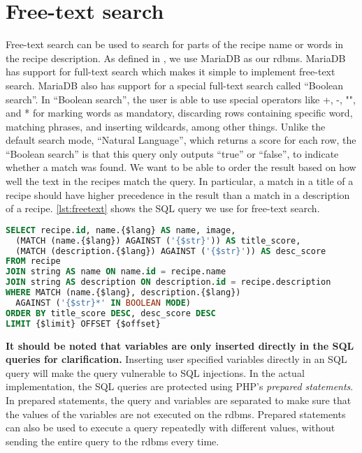 \section{Free-text search}
Free-text search can be used to search for parts of the recipe name or words in the recipe description. As defined in , we use MariaDB as our \ac{rdbms}. MariaDB has support for full-text search which makes it simple to implement free-text search. MariaDB also has support for a special full-text search called ``Boolean search''.\cite{mariafulltext} In ``Boolean search'', the user is able to use special operators like  +, -, "", and *  for marking words as mandatory, discarding rows containing specific word, matching phrases, and inserting wildcards, among other things. Unlike the default search mode, ``Natural Language'', which returns a score for each row, the ``Boolean search'' is that this query only outputs ``true'' or ``false'', to indicate whether a match was found. We want to be able to order the result based on how well the text in the recipes match the query. In particular, a match in a title of a recipe should have higher precedence in the result than a match in a description of a recipe.
\autoref{lst:freetext} shows the SQL query we use for free-text search.

\begin{lstlisting}[language=SQL, morekeywords={AGAINST,OFFSET,BOOLEAN,MODE}, float=h, label={lst:freetext}, caption={Free-text search.}]
SELECT recipe.id, name.{$lang} AS name, image,
  (MATCH (name.{$lang}) AGAINST ('{$str}')) AS title_score,
  (MATCH (description.{$lang}) AGAINST ('{$str}')) AS desc_score
FROM recipe
JOIN string AS name ON name.id = recipe.name
JOIN string AS description ON description.id = recipe.description
WHERE MATCH (name.{$lang}, description.{$lang})
  AGAINST ('{$str}*' IN BOOLEAN MODE)
ORDER BY title_score DESC, desc_score DESC
LIMIT {$limit} OFFSET {$offset}
\end{lstlisting}
\textbf{It should be noted that variables are only inserted directly in the SQL queries for clarification.} Inserting user specified variables directly in an SQL query will make the query vulnerable to SQL injections. In the actual implementation, the SQL queries are protected using PHP's \textit{prepared statements}. In prepared statements, the query and variables are separated to make sure that the values of the variables are not executed on the \ac{rdbms}. Prepared statements can also be used to execute a query repeatedly with different values, without sending the entire query to the \ac{rdbms} every time.

